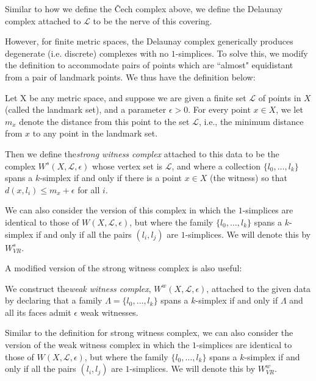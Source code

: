 \documentclass[11pt,reqno,oneside,a4paper]{article}
\begin{document}
\begin{defn}
	Similar to how we define the \v{C}ech complex above, we define the Delaunay complex attached to $\mathcal{L}$ to be the nerve of this covering.
\end{defn}

However, for finite metric spaces, the Delaunay complex generically produces degenerate (i.e. discrete) complexes with no $1$-simplices. To solve this, we modify the definition to accommodate pairs of points which are ``almost" equidistant from a pair of landmark points. We thus have the definition below: 
\begin{defn}
	Let X be any metric space, and suppose we are given a finite set $\mathcal{L}$ of points in $X$ (called the landmark set), and a parameter $\epsilon> 0$. For every point $x \in X$, we let $m_x$ denote the distance from this point to the set $\mathcal{L}$, i.e., the minimum distance from $x$ to any point in the landmark set.
	
	Then we define the\textit{strong witness complex} attached to this data to be the complex $W^s(X,\mathcal{L}, \epsilon)$ whose vertex set is $\mathcal{L}$, and where a collection $\{l_0, \dots, l_k\}$ spans a $k$-simplex if and only if there is a point $x \in X$ (the witness) so that $d(x, l_i)\leq m_x + \epsilon$ for all $i$. 
	
	We can also consider the version of this complex in which the $1$-simplices are identical to those of $W(X,\mathcal{L},\epsilon)$, but where the family $\{l_0, \dots, l_k\}$ spans a $k$-simplex if and only if all the pairs $(l_i, l_j)$ are $1$-simplices. We will denote this by $W^s_{VR}$.
\end{defn}

A modified version of the strong witness complex is also useful:

\begin{defn}
	We construct the\textit{weak witness complex}, $W^w(X,\mathcal{L}, \epsilon)$, attached to the given data by declaring that a family $\Lambda = \{l_0, \dots, l_k\}$ spans a $k$-simplex if and only if $\Lambda$ and all its faces admit $\epsilon$ weak witnesses. 
	
	Similar to the definition for strong witness complex, we can also consider the version of the weak witness complex in which the $1$-simplices are identical to those of $W(X,\mathcal{L},\epsilon)$, but where the family $\{l_0, \dots, l_k\}$ spans a $k$-simplex if and only if all the pairs $(l_i, l_j)$ are $1$-simplices. We will denote this by $W^w_{VR}$.
\end{defn}
\end{document}
